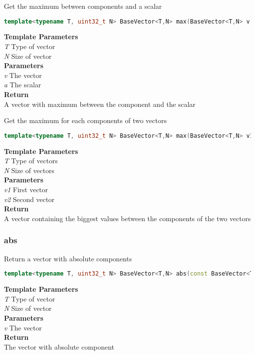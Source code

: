 \begin{mdframed}
Get the maximum between components and a scalar
\begin{lstlisting}[language=C++]
template<typename T, uint32_t N> BaseVector<T,N> max(BaseVector<T,N> v, T a) 
\end{lstlisting}
\textbf{Template Parameters} \\ 
\textit{T} Type of vector \\ 
\textit{N} Size of vector \\ 
\textbf{Parameters} \\ 
\textit{v} The vector \\ 
\textit{a} The scalar \\ 
\textbf{Return} \\ 
A vector with maximum between the component and the scalar\\ 
\end{mdframed}

\begin{mdframed}
Get the maximum for each components of two vectors
\begin{lstlisting}[language=C++]
template<typename T, uint32_t N> BaseVector<T,N> max(BaseVector<T,N> v1, const BaseVector<T,N>& v2) 
\end{lstlisting}
\textbf{Template Parameters} \\ 
\textit{T} Type of vectors \\ 
\textit{N} Size of vectors \\ 
\textbf{Parameters} \\ 
\textit{v1} First vector \\ 
\textit{v2} Second vector \\ 
\textbf{Return} \\ 
A vector containing the biggest values between the components of the two vectors\\ 
\end{mdframed}

\subsubsection{abs}
\begin{mdframed}
Return a vector with absolute components
\begin{lstlisting}[language=C++]
template<typename T, uint32_t N> BaseVector<T,N> abs(const BaseVector<T,N>& v) 
\end{lstlisting}
\textbf{Template Parameters} \\ 
\textit{T} Type of vector \\ 
\textit{N} Size of vector \\ 
\textbf{Parameters} \\ 
\textit{v} The vector \\ 
\textbf{Return} \\ 
The vector with absolute component\\ 
\end{mdframed}

